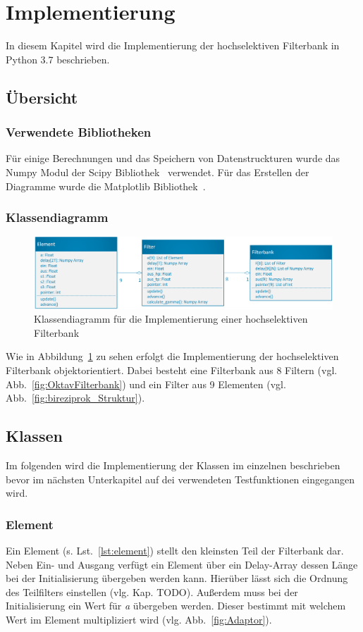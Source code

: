 \section{Implementierung}
In diesem Kapitel wird die Implementierung der hochselektiven Filterbank in Python 3.7 beschrieben.

\subsection{Übersicht}\label{sec:impl_ueber}

\subsubsection{Verwendete Bibliotheken}\label{sec:impl_bib}
Für einige Berechnungen und das Speichern von Datenstruckturen wurde das Numpy Modul der Scipy Bibliothek~\cite{scipy} verwendet. Für das Erstellen der Diagramme wurde die Matplotlib Bibliothek~\cite{Hunter:2007}.
\subsubsection{Klassendiagramm}\label{sec:impl_klass}
\begin{figure}
  \centering
  \includegraphics[width=1\textwidth]{img/klassendia}
  \caption{Klassendiagramm für die Implementierung einer hochselektiven Filterbank}\label{fig:impl_klassdia}
\end{figure}
Wie in Abbildung~\ref{fig:impl_klassdia} zu sehen erfolgt die Implementierung der hochselektiven Filterbank objektorientiert. Dabei besteht eine Filterbank aus 8 Filtern (vgl. Abb.~\ref{fig:OktavFilterbank}) und ein Filter aus 9 Elementen (vgl. Abb.~\ref{fig:bireziprok_Struktur}).
\subsection{Klassen}\label{sec:impl_klassen}
Im folgenden wird die Implementierung der Klassen im einzelnen beschrieben bevor im nächsten Unterkapitel auf dei verwendeten Testfunktionen eingegangen wird.
\subsubsection{Element}\label{sec:impl_ele}
Ein Element (s. Lst.~\ref{lst:element}) stellt den kleinsten Teil der Filterbank dar. Neben Ein- und Ausgang verfügt ein Element über ein Delay-Array dessen Länge bei der Initialisierung übergeben werden kann. Hierüber lässt sich die Ordnung des Teilfilters einstellen (vlg. Kap. TODO). Außerdem muss bei der Initialisierung ein Wert für \emph{a} übergeben werden. Dieser bestimmt mit welchem Wert im Element multipliziert wird (vlg. Abb.~\ref{fig:Adaptor}).

